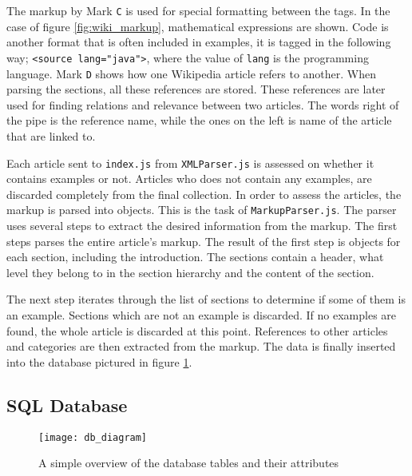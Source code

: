 The markup by Mark \texttt{C} is used for special formatting between the tags. In the case of figure \ref{fig:wiki_markup}, mathematical expressions are shown. Code is another format that is often included in examples, it is tagged in the following way; \texttt{<source lang="java">}, where the value of \texttt{lang} is the programming language. Mark \texttt{D} shows how one Wikipedia article refers to another. When parsing the sections, all these references are stored. These references are later used for finding relations and relevance between two articles. The words right of the pipe is the reference name, while the ones on the left is name of the article that are linked to. 


Each article sent to \texttt{index.js} from \texttt{XMLParser.js} is assessed on whether it contains examples or not. Articles who does not contain any examples, are discarded completely from the final collection. In order to assess the articles, the markup is parsed into objects. This is the task of \texttt{MarkupParser.js}. The parser uses several steps to extract the desired information from the markup. The first steps parses the entire article's markup. The result of the first step is objects for each section, including the introduction. The sections contain a header, what level they belong to in the section hierarchy and the content of the section. 

The next step iterates through the list of sections to determine if some of them is an example. Sections which are not an example is discarded. If no examples are found, the whole article is discarded at this point. References to other articles and categories are then extracted from the markup. The data is finally inserted into the database pictured in figure \ref{fig:db_diagram}.



\subsection{SQL Database}

\begin{figure}[h] 
\caption{A simple overview of the database tables and their attributes}
\texttt{[image: db\_diagram]}
\label{fig:db_diagram}
\end{figure}




